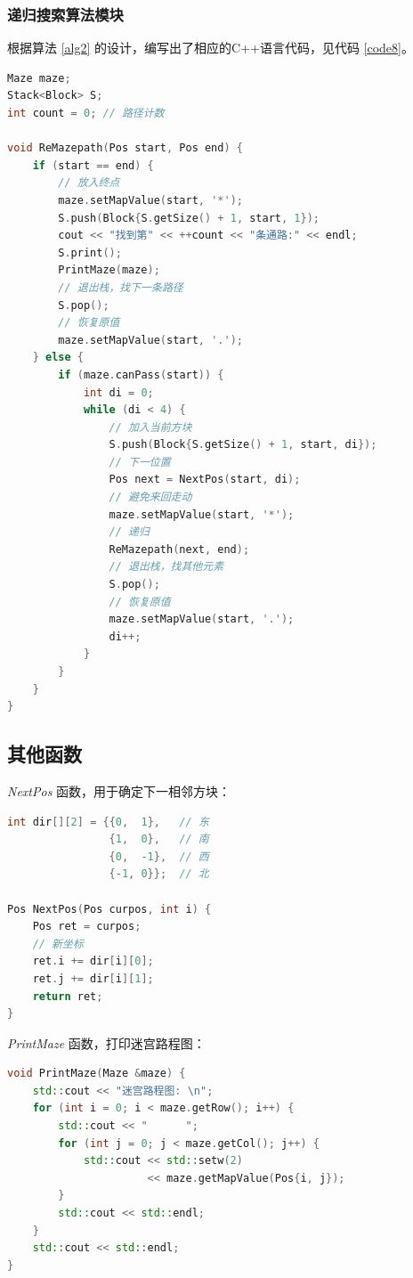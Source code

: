 \documentclass{ctexart}
\begin{document}
    \subsubsection{递归搜索算法模块}
    根据算法 \ref{alg2} 的设计，编写出了相应的C++语言代码，见代码 \ref{code8}。
\begin{lstlisting}[language=C++,caption=递归搜索算法模块代码,label=code8]
Maze maze;
Stack<Block> S;
int count = 0; // 路径计数

void ReMazepath(Pos start, Pos end) {
    if (start == end) {
        // 放入终点
        maze.setMapValue(start, '*');
        S.push(Block{S.getSize() + 1, start, 1});
        cout << "找到第" << ++count << "条通路:" << endl;
        S.print();
        PrintMaze(maze);
        // 退出栈，找下一条路径
        S.pop();
        // 恢复原值
        maze.setMapValue(start, '.');
    } else {
        if (maze.canPass(start)) {
            int di = 0;
            while (di < 4) {
                // 加入当前方块
                S.push(Block{S.getSize() + 1, start, di});
                // 下一位置
                Pos next = NextPos(start, di);
                // 避免来回走动
                maze.setMapValue(start, '*');
                // 递归
                ReMazepath(next, end);
                // 退出栈，找其他元素
                S.pop();
                // 恢复原值
                maze.setMapValue(start, '.');
                di++;
            }
        }
    }
}
\end{lstlisting}

    \subsection{其他函数}
    \emph{NextPos} 函数，用于确定下一相邻方块：
\begin{lstlisting}[language=C++,caption=NextPos函数,label=code9]
int dir[][2] = {{0,  1},   // 东
                {1,  0},   // 南
                {0,  -1},  // 西
                {-1, 0}};  // 北

Pos NextPos(Pos curpos, int i) {
    Pos ret = curpos;
    // 新坐标
    ret.i += dir[i][0];
    ret.j += dir[i][1];
    return ret;
}
\end{lstlisting}

    \emph{PrintMaze} 函数，打印迷宫路程图：
\begin{lstlisting}[language=C++,caption=PrintMaze函数,label=code10]
void PrintMaze(Maze &maze) {
    std::cout << "迷宫路程图: \n";
    for (int i = 0; i < maze.getRow(); i++) {
        std::cout << "      ";
        for (int j = 0; j < maze.getCol(); j++) {
            std::cout << std::setw(2)
                      << maze.getMapValue(Pos{i, j});
        }
        std::cout << std::endl;
    }
    std::cout << std::endl;
}
\end{lstlisting}
\end{document}
